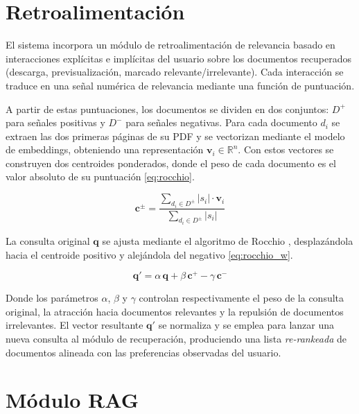 \documentclass[runningheads]{llncs}
\begin{document}
\section{Retroalimentación}

El sistema incorpora un módulo de retroalimentación de relevancia basado en interacciones 
explícitas e implícitas del usuario sobre los documentos recuperados 
(descarga, previsualización, marcado relevante/irrelevante). Cada interacción 
se traduce en una señal numérica de relevancia mediante una función de puntuación.

A partir de estas puntuaciones, los documentos se dividen en dos conjuntos: 
$D^+$ para señales positivas y $D^-$ para señales negativas. 
Para cada documento $d_i$ se extraen las dos primeras páginas de su PDF y se vectorizan 
mediante el modelo de embeddings, obteniendo una representación $\mathbf{v}_i \in \mathbb{R}^n$. 
Con estos vectores se construyen dos centroides ponderados, donde el peso de cada documento 
es el valor absoluto de su puntuación \eqref{eq:rocchio}.

\begin{equation}
\mathbf{c}^{\pm} = \frac{\sum_{d_i \in D^{\pm}} |s_i| \cdot \mathbf{v}_i}{\sum_{d_i \in D^{\pm}} |s_i|}
\label{eq:rocchio}
\end{equation}

La consulta original $\mathbf{q}$ se ajusta mediante el algoritmo de Rocchio \cite{rocchio1971relevance}, 
desplazándola hacia el centroide positivo y alejándola del negativo \eqref{eq:rocchio_w}.

\begin{equation}
\mathbf{q}' = \alpha\,\mathbf{q} + \beta\,\mathbf{c}^{+} - \gamma\,\mathbf{c}^{-}
\label{eq:rocchio_w}
\end{equation}

Donde los parámetros $\alpha$, $\beta$ y $\gamma$ controlan 
respectivamente el peso de la consulta original, la atracción hacia documentos relevantes 
y la repulsión de documentos irrelevantes. El vector resultante $\mathbf{q}'$ se normaliza 
y se emplea para lanzar una nueva consulta al módulo de recuperación, produciendo 
una lista \textit{re-rankeada} de documentos alineada con las preferencias observadas del usuario.

\section{Módulo RAG}
\end{document}
